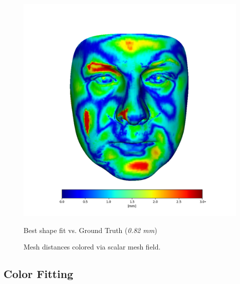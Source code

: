 \begin{figure}
\begin{minipage}{.49\textwidth}
    \includegraphics[width=\textwidth]{Figures/Pictures/gtBig_tnew.png}
    \caption*{Best shape fit vs. Ground Truth (\textit{0.82 mm})}
  \end{minipage}  
  \caption{Mesh distances colored via scalar mesh field.  }
  \label{f3.17}
\end{figure}

\subsection{Color Fitting}\label{s3.4.3}


